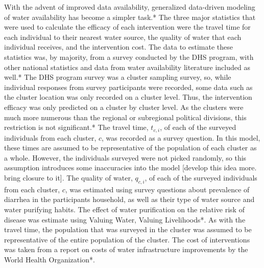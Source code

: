 With the advent of improved data availability, generalized data-driven modeling of water availability has become a simpler task.* The three major statistics that were used to calculate the efficacy of each intervention were the travel time for each individual to their nearest water source, the quality of water that each individual receives, and the intervention cost. The data to estimate these statistics was, by majority, from a survey conducted by the DHS program, with other national statistics and data from water availability literature included as well.*
The DHS program survey was a cluster sampling survey, so, while individual responses from survey participants were recorded, some data such as the cluster location was only recorded on a cluster level. Thus, the intervention efficacy was only predicted on a cluster by cluster level. As the clusters were much more numerous than the regional or subregional political divisions, this restriction is not significant.*
The travel time, $t_{c,i}$, of each of the surveyed individuals from each cluster, $c$, was recorded as a survey question. In this model, these times are assumed to be representative of the population of each cluster as a whole. However, the individuals surveyed were not picked randomly, so this assumption introduces some inaccuracies into the model [develop this idea more. bring closure to it].
The quality of water, $q_{c,i}$, of each of the surveyed individuals from each cluster, $c$, was estimated using survey questions about prevalence of diarrhea in the participants household, as well as their type of water source and water purifying habits. The effect of water purification on the relative risk of disease was estimate using Valuing Water, Valuing Livelihoods*. As with the travel time, the population that was surveyed in the cluster was assumed to be representative of the entire population of the cluster.
The cost of interventions was taken from a report on costs of water infrastructure improvements by the World Health Organization*. 